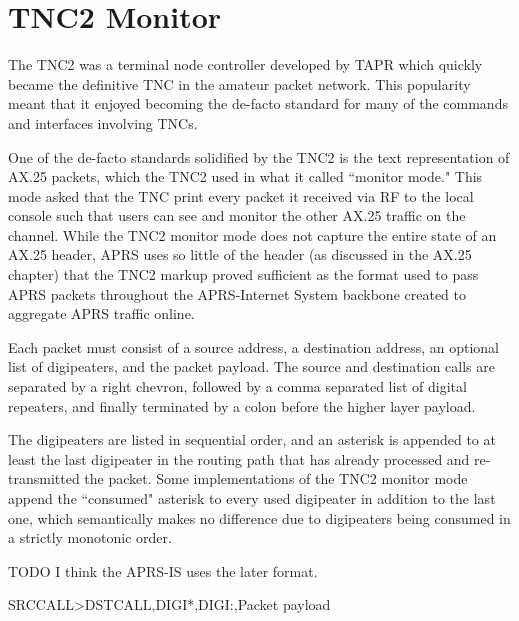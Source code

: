 \chapter{TNC2 Monitor}

The TNC2 was a terminal node controller developed by TAPR which
quickly became the definitive TNC in the amateur packet network.
This popularity meant that it enjoyed becoming the de-facto 
standard for many of the commands and interfaces involving 
TNCs.

One of the de-facto standards solidified by the TNC2 is the text
representation of AX.25 packets, which the TNC2 used in what it
called ``monitor mode." This mode asked that the TNC print 
every packet it received via RF to the local console such that
users can see and monitor the other AX.25 traffic on the channel.
While the TNC2 monitor mode does not capture the entire state of 
an AX.25 header, APRS uses so little of the header (as discussed in
the AX.25 chapter) that the TNC2 markup proved sufficient as the 
format used to pass APRS packets throughout the APRS-Internet System
backbone created to aggregate APRS traffic online.

Each packet must consist of a source address, a destination address,
an optional list of digipeaters, and the packet payload.
The source and destination calls are separated by a right chevron,
followed by a comma separated list of digital repeaters, and finally
terminated by a colon before the higher layer payload.

The digipeaters are listed in sequential order, and an asterisk
is appended to at least the last digipeater in the 
routing path that has already processed and re-transmitted the packet.
Some implementations of the TNC2 monitor mode append the ``consumed"
asterisk to every used digipeater in addition to the last one,
which semantically makes no difference due to digipeaters
being consumed in a strictly monotonic order.

TODO I think the APRS-IS uses the later format.

SRCCALL\textgreater{}DSTCALL,DIGI*,DIGI:,Packet payload
